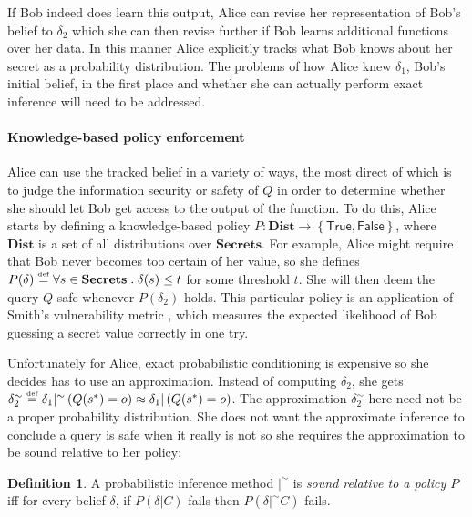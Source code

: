 \documentclass{article} %
\newcommand{\ra}{\rightarrow}
\newcommand{\secrets}[0]{\textbf{Secrets}}
\newcommand{\asecret}[0]{s}
\newcommand{\rsecret}[0]{\asecret^*}
\newcommand{\dists}[0]{\textbf{Dist}}
\newcommand{\sconst}[1]{\ensuremath{\mathsf{#1}}}
\newcommand{\strue}{\sconst{True}}
\newcommand{\sfalse}{\sconst{False}}
\newcommand{\paren}[1]{\left( #1 \right)}
\newcommand{\set}[1]{\left\{ #1 \right\}}
\newcommand{\acond}[0]{|^\sim}
\newcommand{\qsep}[0]{\; . \;}
\newcommand{\stacklabel}[1]{\stackrel{\smash{\scriptscriptstyle \mathrm{#1}}}}
\newcommand{\defeq}{\stacklabel{def}=}
\theoremstyle{plain} %
\theoremstyle{definition} %
\newtheorem*{definition-un}{Definition}
\begin{document}
If Bob indeed does learn this output, Alice can revise her
representation of Bob's belief to $ \delta_2 $ which she can then
revise further if Bob learns additional functions over her data. In
this manner Alice explicitly tracks what Bob knows about her secret
as a probability distribution. The problems of how Alice knew $
\delta_1 $, Bob's initial belief, in the first place and whether she
can actually perform exact inference will need to be
addressed.

\paragraph*{Knowledge-based policy enforcement}

Alice can use the tracked belief in a variety of ways, the most direct
of which is to judge the information security or safety of $ Q $ in
order to determine whether she should let Bob get access to the output
of the function. To do this, Alice starts by defining a
knowledge-based policy $ P : \dists \ra \set{\strue,\sfalse} $, where
$ \dists $ is a set of all distributions over $ \secrets $. For
example, Alice might require that Bob never becomes too certain of her
value, so she defines $ P(\delta) \defeq \forall \asecret \in \secrets \qsep
\delta(\asecret) \leq t $ for some threshold $ t $. She will then deem the
query $ Q $ safe whenever $ P(\delta_2) $ holds. This particular
policy is an application of Smith's vulnerability metric
\cite{smith09foundations}, which measures the expected likelihood of
Bob guessing a secret value correctly in one try.

Unfortunately for Alice, exact probabilistic conditioning is expensive
so she decides has to use an approximation. Instead of computing $
\delta_2 $, she gets $ \delta_2^\sim \defeq \delta_1 \acond
\paren{Q(\rsecret) = o} \approx \delta_1 | \paren{Q(\rsecret) = o} $. The
approximation $ \delta_2^\sim $ here need not be a proper probability
distribution. She does not want the approximate inference to conclude
a query is safe when it really is not so she requires the
approximation to be sound relative to her policy:

\begin{definition-un} A probabilistic inference method $ |^\sim $ is
  \emph{sound relative to a policy $ P $} iff for every belief $
  \delta $, if $ P(\delta | C) $ fails then $ P(\delta |^\sim C) $
  fails.
\end{definition-un}
\end{document}
